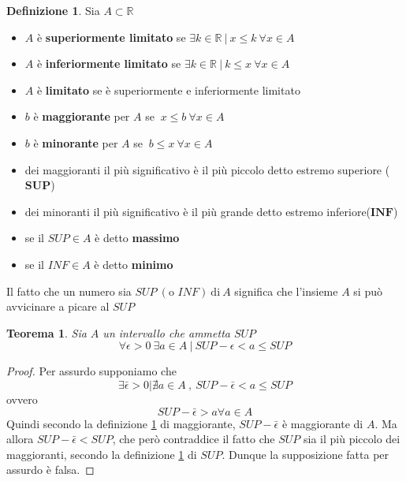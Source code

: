 \documentclass[]{report}
\theoremstyle{definition}
\newtheorem{defin}{Definizione}[chapter]
\theoremstyle{remark}
\theoremstyle{plain}
\newtheorem{theor}{Teorema}[chapter]
\numberwithin{equation}{chapter}
\begin{document}
\begin{defin}\label{limitazioni inisiemi}
	Sia $A \subset \mathbb{R} $
	\begin{itemize}
		\item 
	$A$ \`{e} \textbf{superiormente limitato} se $\exists k \in \mathbb{R} \ | \ x \leq k \ \forall x \in A$
		\item	
	$A$ \`{e} \textbf{inferiormente limitato} se $\exists k \in \mathbb{R} \ | \ k \leq x \ \forall x \in A$
		\item	
	$A$ \`{e} \textbf{limitato} se \`{e} superiormente e inferiormente limitato
		\item	
	$b$ \`{e} \textbf{maggiorante} per $A$ se $\ x \leq b \ \forall x \in A$
		\item	
	$b$ \`{e} \textbf{minorante} per $A$ se $\ b \leq x \ \forall x \in A$
		\item	
	dei maggioranti il pi\`{u} significativo \`{e} il pi\`{u} piccolo detto estremo superiore ($\mathbf{SUP}$)
		\item	
	dei minoranti il pi\`{u} significativo \`{e} il pi\`{u} grande detto estremo inferiore($\mathbf{INF}$)
		\item	
	se il $SUP \in A$ \`{e} detto \textbf{massimo}
		\item	
	se il $INF \in A$ \`{e} detto \textbf{minimo}
	\end{itemize}
\end{defin}

Il fatto che un numero sia $SUP \ (\textrm{o }INF)  \ \textrm{di} \ A$ significa che l'insieme $A$ si pu\`{o} avvicinare a picare al $SUP$ 

\begin{theor}\label{th sup}
	Sia $A$ un intervallo che ammetta $SUP$
	$$\forall \epsilon > 0 \ \exists a \in A \ | \ SUP-\epsilon < a \leq SUP $$
\end{theor}
\begin{proof}
	Per assurdo supponiamo che
	$$\exists \bar{\epsilon} > 0 | \nexists a \in A \ , \ SUP - \bar{\epsilon} < a \leq SUP$$
	ovvero
	$$SUP - \bar{\epsilon} > a \forall a \in A$$
	Quindi secondo la definizione \ref{limitazioni inisiemi} di maggiorante, $SUP - \bar{\epsilon}$ \`{e} maggiorante di $A$.
	Ma allora $SUP - \bar{\epsilon} < SUP$, che per\`{o} contraddice il fatto che $SUP$ sia il pi\`{u} piccolo dei maggioranti, secondo la definizione \ref{limitazioni inisiemi} di $SUP$. Dunque la supposizione fatta per assurdo \`{e} falsa.
\end{proof}
\end{document}
